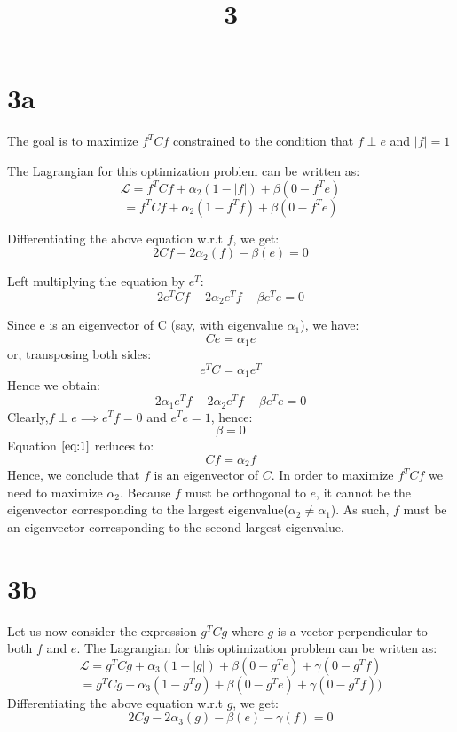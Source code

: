 \documentclass[a4paper]{article}
\title{3}
\date{}
\begin{document}
\maketitle


\section{3a}
The goal is to maximize $f^{T}Cf$ constrained to the condition that $f \perp e$ and $\lvert f \rvert = 1$

The Lagrangian for this optimization problem can be written as:
\[\mathscr{L} = f^{T}Cf + \alpha_{2}(1 - \lvert f \rvert) + \beta(0 - f^{T}e)\]
\[ =  f^{T}Cf + \alpha_{2}(1 - f^{T}f) + \beta(0 - f^{T}e) \]

Differentiating the above equation w.r.t $f$, we get:
\begin{equation}
 2Cf - 2\alpha_{2}(f)  -\beta(e) = 0 \label{eq:1}
\end{equation}

Left multiplying the equation by $e^{T}$:
\[2e^{T}Cf - 2\alpha_{2}e^{T}f - \beta e^{T}e = 0\]

Since e is an eigenvector of C (say, with eigenvalue $\alpha_{1}$), we have:
\[ Ce = \alpha_{1}e\]
or, transposing both sides:
\[e^{T}C = \alpha_{1}e^{T}\]
Hence we obtain:
\[2\alpha_{1}e^{T}f - 2\alpha_{2}e^{T}f - \beta e^{T}e = 0\]
Clearly,$f \perp e \implies  e^{T}f = 0$ and $e^{T}e = 1$, hence:
\[\beta = 0\]
Equation $\eqref{eq:1}$ reduces to:
\[Cf = \alpha_{2}f\]
Hence, we conclude that $f$ is an eigenvector of $C$. In order to maximize $f^{T}Cf$ we need to maximize $\alpha_2$. Because $f$ must be orthogonal to $e$, it cannot be the eigenvector corresponding to the largest eigenvalue($\alpha_{2} \neq \alpha_{1}$). As such, $f$ must be an eigenvector corresponding to the second-largest eigenvalue.
\section{3b}
Let us now consider the expression $g^{T}Cg$ where $g$ is a vector perpendicular to both $f$ and $e$. The Lagrangian for this optimization problem can be written as:
\[\mathscr{L} = g^{T}Cg + \alpha_{3}(1 - \lvert g \rvert) + \beta(0 - g^{T}e) + \gamma(0 - g^{T}f )\]
\[ = g^{T}Cg + \alpha_{3}(1 - g^{T}g) + \beta(0 - g^{T}e) + \gamma(0 - g^{T}f )) \]
Differentiating the above equation w.r.t $g$, we get:
\begin{equation}
 2Cg - 2\alpha_{3}(g)  -\beta(e) - \gamma(f) = 0 \label{eq:2}
\end{equation}
\end{document}
